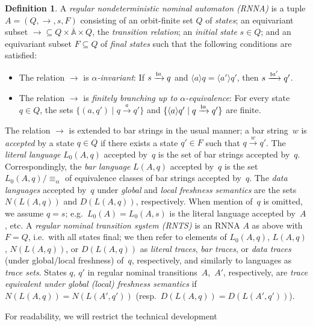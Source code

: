 \documentclass[a4paper,UKenglish,cleveref,thm-restate,numberwithinsect,final]{lipics-v2021}
\newcommand{\Names}{\mathbb{A}}
\newcommand{\barNames}{\overline{\Names}}
\newcommand{\alphaeq}{\equiv_\alpha}
\newcommand{\bind}[1]{\langle #1\rangle}
\theoremstyle{plain}
\newcommand{\scriptmidmid}{\hspace{0.2ex}{\rule[-0.1ex]{0.6pt}{1.1ex}}\hspace{0.2ex}}
\newcommand{\scriptnew}[1]{{\scriptmidmid}#1}
\numberwithin{equation}{section}
\newcommand{\+}[1]{\mathcal{#1}\xspace}
\theoremstyle{definition}
\newtheorem{defn}[theorem]{Definition}
\begin{document}
\begin{defn}
  A \emph{regular nondeterministic nominal automaton (RNNA)} is a
  tuple \(A=(Q, \to, s, F)\) consisting of an orbit-finite set \(Q\)
  of \emph{states}; an equivariant subset
  \({\to} \subseteq Q \times \barNames \times Q\), the
  \emph{transition relation}; an \emph{initial state} \(s \in Q\); and
  an equivariant subset \(F \subseteq Q\) of \emph{final states} such
  that the following conditions are satisfied:
    \begin{itemize}
    \item The relation \(\to\) is \emph{$\alpha$-invariant}: If
      \(s \xrightarrow{\scriptnew a} q\) and
      \(\bind aq = \bind{a'}q'\), then
      \(s \xrightarrow{\scriptnew a'} q'\).
    \item The relation \(\to\) is \emph{finitely branching up to
        $\alpha$-equivalence}: For every state \(q \in Q\), the sets
      \(\{(a, q') \mid q \xrightarrow{a} q'\}\) and
      \(\{\bind aq' \mid q \xrightarrow{\scriptnew a} q'\}\) are
      finite.
    \end{itemize}
    The relation \(\to\) is extended to bar strings in the usual
    manner; a bar string~$w$ is \emph{accepted} by a state $q\in Q$ if
    there exists a state $q'\in F$ such that $q\xrightarrow{w}
    q'$. The \emph{literal language} $L_0(A,q)$ accepted by~$q$ is the
    set of bar strings accepted by~$q$. Correspondingly, the \emph{bar
      language} $L(A,q)$ accepted by~$q$ is the
    set~$L_0(A,q)/{\alphaeq}$ of equivalence classes of bar strings
    accepted by~$q$. The \emph{data languages} accepted by~$q$ under
    \emph{global} and \emph{local freshness semantics} are the sets
    $N(L(A,q))$ and $D(L(A,q))$, respectively. When mention of~$q$ is
    omitted, we assume $q=s$; e.g.\ $L_0(A)=L_0(A,s)$ is the literal
    language accepted by~$A$, etc. A \emph{regular nominal transition
      system (RNTS)} is an RNNA $A$ as above with $F=Q$, i.e.~with all
    states final; we then refer to elements of $L_0(A,q)$, $L(A,q)$,
    $N(L(A,q))$, or $D(L(A,q))$ as \emph{literal traces}, \emph{bar
      traces}, or \emph{data traces} (under global/local freshness)
    of~$q$, respectively, and similarly to languages as \emph{trace
      sets}. States $q$, $q'$ in regular nominal
    transitions~$A$,~$A'$, respectively, are \emph{trace equivalent
      under global (local) freshness semantics} if
    $N(L(A,q))=N(L(A',q'))$ (resp.~$D(L(A,q))=D(L(A',q'))$).
\end{defn}
\noindent For readability, we will restrict the technical development
\end{document}
